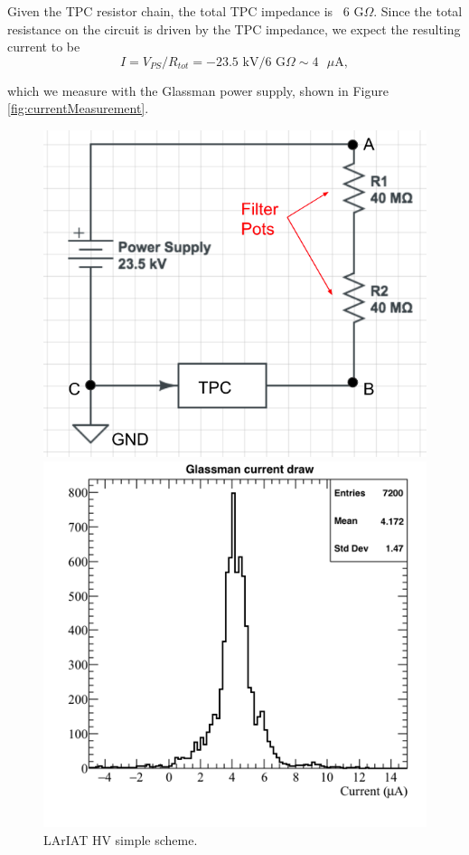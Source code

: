 Given the TPC resistor chain, the total TPC impedance is ~6 G$\Omega$. Since the total resistance on the circuit is driven by the TPC impedance, we expect the resulting current to be 
\begin{equation}
I=V_{PS} /R_{tot} = -23.5\text{ kV}/6 \text{ G}\Omega  \sim 4 \text{ $\mu$A}, 
\end{equation}

which we measure with the Glassman power supply, shown in  Figure \ref{fig:currentMeasurement}.  

\begin{figure}[h]
\centering
\begin{minipage}{0.45\textwidth}
\centering
\includegraphics[width=\textwidth]{AppendixB-EField/Images/CircuitLArIAT.png}
\caption{LArIAT HV simple scheme.}
\label{fig:circuit}
\end{minipage}\hfill
\begin{minipage}{0.45\textwidth}
\centering
\includegraphics[width=\textwidth]{AppendixB-EField/Images/glassman_current_20160525-30.png}

\end{minipage}
\end{figure}

